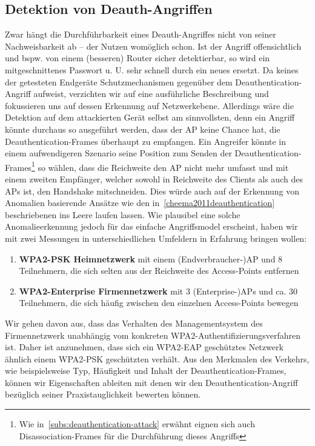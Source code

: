 \subsection{Detektion von Deauth-Angriffen}
Zwar hängt die Durchführbarkeit eines Deauth-Angriffes nicht von seiner Nachweisbarkeit ab -- der Nutzen womöglich schon. Ist der Angriff offensichtlich und bspw. von einem (besseren) Router sicher detektierbar, so wird ein mitgeschnittenes Passwort u. U. sehr schnell durch ein neues ersetzt.
Da keines der getesteten Endgeräte Schutzmechanismen gegenüber dem Deauthentication-Angriff aufweist, verzichten wir auf eine ausführliche Beschreibung und fokussieren uns auf dessen Erkennung auf Netzwerkebene. Allerdings wäre die Detektion auf dem attackierten Gerät selbst am sinnvollsten, denn ein Angriff könnte durchaus so ausgeführt werden, dass der AP keine Chance hat, die Deauthentication-Frames überhaupt zu empfangen.
Ein Angreifer könnte in einem aufwendigeren Szenario seine Position zum Senden der Deauthentication-Frames\footnote{Wie in~\ref{subs:deauthentication-attack} erwähnt eignen sich auch Disassociation-Frames für die Durchführung dieses Angriffs} so wählen, dass die Reichweite den AP nicht mehr umfasst und mit einem zweiten Empfänger, welcher sowohl in Reichweite des Clients als auch des APs ist, den Handshake mitschneiden.
Dies würde auch auf der Erkennung von Anomalien basierende Ansätze wie den in~\ref{cheema2011deauthentication} beschriebenen ins Leere laufen lassen. Wie plausibel eine solche Anomalieerkennung jedoch für das einfache Angriffsmodel erscheint, haben wir mit zwei Messungen in unterschiedlichen Umfeldern in Erfahrung bringen wollen:
\begin{enumerate}
	\item \textbf{WPA2-PSK Heimnetzwerk} mit einem (Endverbraucher-)AP und 8 Teilnehmern, die sich selten aus der Reichweite des Access-Points entfernen
	\item \textbf{WPA2-Enterprise Firmennetzwerk} mit 3 (Enterprise-)APs und ca. 30 Teilnehmern, die sich häufig zwischen den einzelnen Access-Points bewegen
\end{enumerate}
Wir gehen davon aus, dass das Verhalten des Managementsystem des Firmennetzwerk unabhängig vom konkreten WPA2-Authentifizierungsverfahren ist.
Daher ist anzunehmen, dass sich ein WPA2-EAP geschütztes Netzwerk ähnlich einem WPA2-PSK geschützten verhält.
Aus den Merkmalen des Verkehrs, wie beispielsweise Typ, Häufigkeit und Inhalt der Deauthentication-Frames, können wir Eigenschaften ableiten mit denen wir den Deauthentication-Angriff bezüglich seiner Praxistauglichkeit bewerten können.

